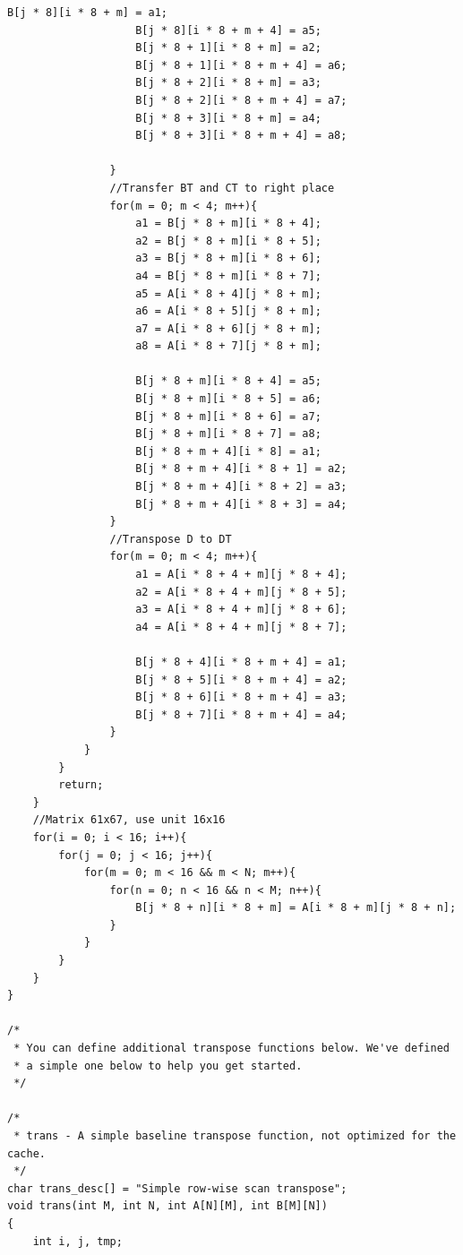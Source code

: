 \documentclass{article}
\begin{document}
\begin{lstlisting}[title=trans.c, frame=shadowbox]
                    B[j * 8][i * 8 + m] = a1;
                    B[j * 8][i * 8 + m + 4] = a5;
                    B[j * 8 + 1][i * 8 + m] = a2;
                    B[j * 8 + 1][i * 8 + m + 4] = a6;
                    B[j * 8 + 2][i * 8 + m] = a3;
                    B[j * 8 + 2][i * 8 + m + 4] = a7;
                    B[j * 8 + 3][i * 8 + m] = a4;
                    B[j * 8 + 3][i * 8 + m + 4] = a8;

                }
                //Transfer BT and CT to right place 
                for(m = 0; m < 4; m++){
                    a1 = B[j * 8 + m][i * 8 + 4];
                    a2 = B[j * 8 + m][i * 8 + 5];
                    a3 = B[j * 8 + m][i * 8 + 6];
                    a4 = B[j * 8 + m][i * 8 + 7];
                    a5 = A[i * 8 + 4][j * 8 + m];
                    a6 = A[i * 8 + 5][j * 8 + m];
                    a7 = A[i * 8 + 6][j * 8 + m];
                    a8 = A[i * 8 + 7][j * 8 + m];
                    
                    B[j * 8 + m][i * 8 + 4] = a5;
                    B[j * 8 + m][i * 8 + 5] = a6;
                    B[j * 8 + m][i * 8 + 6] = a7;
                    B[j * 8 + m][i * 8 + 7] = a8;
                    B[j * 8 + m + 4][i * 8] = a1;
                    B[j * 8 + m + 4][i * 8 + 1] = a2;
                    B[j * 8 + m + 4][i * 8 + 2] = a3;
                    B[j * 8 + m + 4][i * 8 + 3] = a4;
                }
                //Transpose D to DT
                for(m = 0; m < 4; m++){
                    a1 = A[i * 8 + 4 + m][j * 8 + 4];
                    a2 = A[i * 8 + 4 + m][j * 8 + 5];
                    a3 = A[i * 8 + 4 + m][j * 8 + 6];
                    a4 = A[i * 8 + 4 + m][j * 8 + 7];

                    B[j * 8 + 4][i * 8 + m + 4] = a1;
                    B[j * 8 + 5][i * 8 + m + 4] = a2;
                    B[j * 8 + 6][i * 8 + m + 4] = a3;
                    B[j * 8 + 7][i * 8 + m + 4] = a4;  
                }
            }
        }
        return;
    }
    //Matrix 61x67, use unit 16x16
    for(i = 0; i < 16; i++){
        for(j = 0; j < 16; j++){
            for(m = 0; m < 16 && m < N; m++){
                for(n = 0; n < 16 && n < M; n++){
                    B[j * 8 + n][i * 8 + m] = A[i * 8 + m][j * 8 + n];
                }
            }
        }
    }
}

/* 
 * You can define additional transpose functions below. We've defined
 * a simple one below to help you get started. 
 */ 

/* 
 * trans - A simple baseline transpose function, not optimized for the cache.
 */
char trans_desc[] = "Simple row-wise scan transpose";
void trans(int M, int N, int A[N][M], int B[M][N])
{
    int i, j, tmp;


\end{lstlisting}
\end{document}
